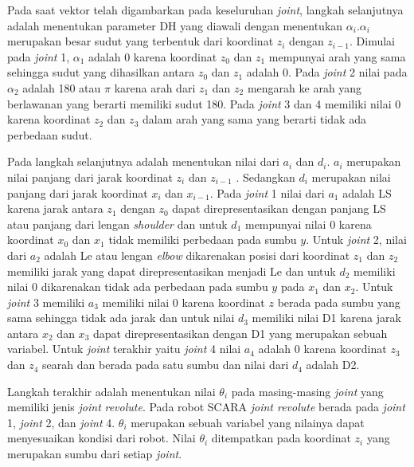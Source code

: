 Pada saat vektor telah digambarkan pada keseluruhan \textit{joint}, langkah selanjutnya adalah menentukan parameter DH yang diawali dengan menentukan $\alpha_{i}. \alpha_{i}$ merupakan besar sudut yang terbentuk dari koordinat $z_{i}$ dengan $z_{i-1}$.  Dimulai pada \textit{joint} 1, $\alpha_{1}$ adalah 0 karena koordinat $z_{0}$ dan $z_{1}$ mempunyai arah yang sama sehingga sudut yang dihasilkan antara $z_{0}$ dan $z_{1}$ adalah 0.  Pada \textit{joint} 2 nilai pada $\alpha_{2}$ adalah 180 atau  $\pi$ karena arah dari  $z_{1}$ dan  $z_{2}$ mengarah ke arah yang berlawanan yang berarti memiliki sudut 180. Pada \textit{joint} 3 dan 4 memiliki nilai 0 karena koordinat $z_{2}$ dan $z_{3}$ dalam arah yang sama yang berarti tidak ada perbedaan sudut.

Pada langkah selanjutnya adalah menentukan nilai dari $a_{i}$ dan $d_{i}$. $a_{i}$ merupakan nilai panjang dari jarak koordinat  $z_{i}$  dan  $z_{i-1}$ . Sedangkan $d_{i}$ merupakan nilai panjang dari jarak koordinat $x_{i}$ dan $x_{i-1}$. Pada \textit{joint} 1 nilai dari $a_{1}$ adalah LS karena jarak antara $z_{1}$ dengan $z_{0}$ dapat direpresentasikan dengan panjang LS atau panjang dari lengan \textit{shoulder} dan untuk $d_{1}$ mempunyai nilai 0 karena koordinat $x_{0}$ dan $x_{1}$ tidak memiliki perbedaan pada sumbu $y$. Untuk \textit{joint} 2, nilai dari $a_{2}$ adalah Le atau lengan \textit{elbow} dikarenakan posisi dari koordinat $z_{1}$  dan $z_{2}$  memiliki jarak yang dapat direpresentasikan menjadi Le dan untuk  $d_{2}$ memiliki nilai 0 dikarenakan tidak ada perbedaan pada sumbu $y$ pada  $x_{1}$ dan  $x_{2}$.  Untuk \textit{joint} 3 memiliki $a_{3}$ memiliki nilai 0 karena koordinat $z$ berada pada sumbu yang sama sehingga tidak ada jarak dan untuk nilai $d_{3}$  memiliki nilai D1 karena jarak antara $x_{2}$ dan $x_{3}$ dapat direpresentasikan dengan D1 yang merupakan sebuah variabel. Untuk \textit{joint} terakhir yaitu \textit{joint} 4 nilai $a_{4}$ adalah 0 karena koordinat $z_{3}$ dan $z_{4}$ searah dan berada pada satu sumbu dan nilai dari $d_{4}$ adalah D2.

Langkah terakhir adalah menentukan nilai $\theta_{i}$ pada masing-masing \textit{joint} yang memiliki jenis \textit{joint}  \textit{revolute}. Pada robot SCARA \textit{joint revolute} berada pada \textit{joint} 1, \textit{joint} 2, dan \textit{joint} 4.  $\theta_{i}$ merupakan sebuah variabel yang nilainya dapat menyesuaikan kondisi dari robot. Nilai  $\theta_{i}$ ditempatkan pada koordinat $z_{i}$ yang merupakan sumbu dari setiap \textit{joint}. 

